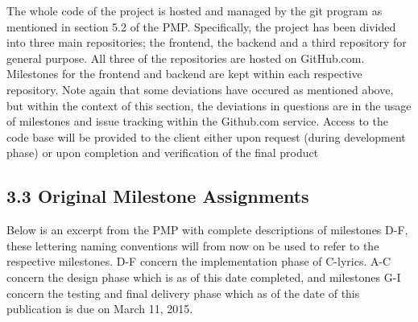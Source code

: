 \documentclass[]{article}
\begin{document}
The whole code of the project is hosted and managed by the git program
as mentioned in section 5.2 of the PMP. Specifically, the project has
been divided into three main repositories; the frontend, the backend and
a third repository for general purpose. All three of the repositories
are hosted on GitHub.com. Milestones for the frontend and backend are
kept within each respective repository. Note again that some deviations
have occured as mentioned above, but within the context of this section,
the deviations in questions are in the usage of milestones and issue
tracking within the Github.com service. Access to the code base will be
provided to the client either upon request (during development phase) or
upon completion and verification of the final product

\subsection{3.3 Original Milestone
Assignments}\label{original-milestone-assignments}

Below is an excerpt from the PMP with complete descriptions of
milestones D-F, these lettering naming conventions will from now on be
used to refer to the respective milestones. D-F concern the
implementation phase of C-lyrics. A-C concern the design phase which is
as of this date completed, and milestones G-I concern the testing and
final delivery phase which as of the date of this publication is due on
March 11, 2015.
\end{document}
